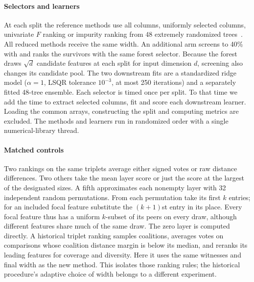 \paragraph{Selectors and learners}
At each split the reference methods use all columns, uniformly selected columns, univariate $F$ ranking or impurity ranking from 48 extremely randomized trees~\citep{geurts2006trees}. All reduced methods receive the same width. An additional arm screens to 40\% with \method{} and ranks the survivors with the same forest selector. Because the forest draws $\sqrt d$ candidate features at each split for input dimension $d$, screening also changes its candidate pool. The two downstream fits are a standardized ridge model ($\alpha=1$, LSQR tolerance $10^{-3}$, at most 250 iterations) and a separately fitted 48-tree ensemble. Each selector is timed once per split. To that time we add the time to extract selected columns, fit and score each downstream learner. Loading the common arrays, constructing the split and computing metrics are excluded. The methods and learners run in randomized order with a single numerical-library thread.

\paragraph{Matched controls}
Two rankings on the same triplets average either signed votes or raw distance differences. Two others take the mean layer score or just the score at the largest of the designated sizes. A fifth approximates each nonempty layer with 32 independent random permutations. From each permutation take its first $k$ entries; for an included focal feature substitute the $(k+1)$st entry in its place. Every focal feature thus has a uniform $k$-subset of its peers on every draw, although different features share much of the same draw. The zero layer is computed directly. A historical triplet ranking samples coalitions, averages votes on comparisons whose coalition distance margin is below its median, and reranks its leading features for coverage and diversity. Here it uses the same witnesses and final width as the new method. This isolates those ranking rules; the historical procedure's adaptive choice of width belongs to a different experiment.

